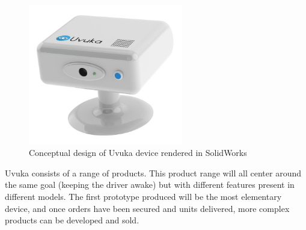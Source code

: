 \begin{figure}[H]
\centering
\includegraphics[width=0.6\textwidth]{images/Uvuka_casing_concept.JPG}
\vskip10pt
\caption[The caption that appears in the list of figures]{Conceptual design of Uvuka device rendered in SolidWorks}
\label{fig:Uvuka_casing_concept}
\end{figure}

Uvuka consists of a range of products. This product range will all center around the same goal (keeping the driver awake) but with different features present in different models. The first prototype produced will be the most elementary device, and once orders have been secured and units delivered,  more complex products can be developed and sold.

